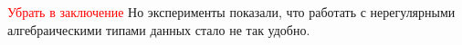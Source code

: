 \textcolor{red}{Убрать в заключение}
Но эксперименты показали, что  работать с нерегулярными~\cite{irregular} алгебраическими типами данных стало не так удобно.

\begin{comment}
\section{Введение от 26.11}

Обобщённое программирование нацелено на предание  языкам программирования большей гибкими без потери  типовой безопасности {\color {blue} нужна ссылка на классическую работу по обобщенному программированию}. В частности, предлагается  на стадии компиляции программы автоматическое порождение   для её типов данных ряда преобразований с целью инкапсуляции работы с этими типами~\cite{DGP}. Обобщённое программирование широко применяется  к алгебраическим типам данных в  классических типизированных функциональных языках программирования (\ocaml{}, \haskell{}), а также начинает использоваться в объектно-ориентированных языках и платформах, например, \textsc{.NET Source Generators}~\cite{dotNetSG}.


При разработке программного обеспечения на функциональных языках программирования, зачастую бывает необходимо реализовывать однотипные преобразования для различных структур данных. Для динамически типизированных языков (например, \scheme{}) есть возможность  реализовать одну функцию-метапреобразование, подходящую для всех структур данных. В языках, среды исполнения которых содержат информацию о типах (например, \Scala{}), имеется  возможность построить метапреобразование во время исполнения, полагаясь на динамический анализ типов  (интроспецию) и создание новых типов данных "на лету" (рефлексия). 
 Для статически типизированных языков программирования, в средах исполнения которых информация о типах обычно не доступна во время исполнения (например, \ocaml{} и \haskell{}), применяется подход под названием 
\emph{обобщенное (generic) программирование}~\cite{Yallop,PPXLib}: 
на стадии компиляции  по описанию типа данных автоматически генерируется нужные преобразования, специализированные для указанных типов данных. 
Обобщённое программирование является стандартным подходом для этих языков, поэтому различным его модификациям крайне желательно, как минимум, повторять его функциональность, а также предоставлять такой же интерфейс использования, чтобы выглядеть знакомыми и понятными практикующему разработчику.


При использовании обобщённого программирования бывают ситуации, когда автоматически сгенерированные преобразования не имеют необходимой для данной задачи функциональности. В объектно-ориентированных языках программирования  преобразования представляются в виде расширяемых объектов, и у программиста имеется возможность их менять. Но в функциональных языках такие преобразования генерируются в виде готовых функций, и менять их не представляется возможным.  Соответственно, применение обобщённого программирования в функциональных языках наталкивается на препятствия.


\end{comment}
